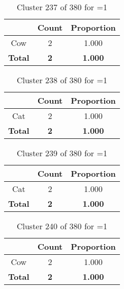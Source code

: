 \begin{table}[ht!]
\centering
\begin{tabular}{|c|c|c|}
\hline
\bf \Spec{} &\bf Count &\bf Proportion\\ \hline \hline
Cow & 2 & 1.000\\ \hline
\hline
\bf Total & \bf 2 & \bf 1.000\\ \hline
\end{tabular}
\label{tab:cluster:237:1}
\caption{Cluster 237 of 380 for \minneigh{}=1}
\end{table}

\begin{table}[ht!]
\centering
\begin{tabular}{|c|c|c|}
\hline
\bf \Spec{} &\bf Count &\bf Proportion\\ \hline \hline
Cat & 2 & 1.000\\ \hline
\hline
\bf Total & \bf 2 & \bf 1.000\\ \hline
\end{tabular}
\label{tab:cluster:238:1}
\caption{Cluster 238 of 380 for \minneigh{}=1}
\end{table}

\begin{table}[ht!]
\centering
\begin{tabular}{|c|c|c|}
\hline
\bf \Spec{} &\bf Count &\bf Proportion\\ \hline \hline
Cat & 2 & 1.000\\ \hline
\hline
\bf Total & \bf 2 & \bf 1.000\\ \hline
\end{tabular}
\label{tab:cluster:239:1}
\caption{Cluster 239 of 380 for \minneigh{}=1}
\end{table}

\clearpage
\begin{table}[ht!]
\centering
\begin{tabular}{|c|c|c|}
\hline
\bf \Spec{} &\bf Count &\bf Proportion\\ \hline \hline
Cow & 2 & 1.000\\ \hline
\hline
\bf Total & \bf 2 & \bf 1.000\\ \hline
\end{tabular}
\label{tab:cluster:240:1}
\caption{Cluster 240 of 380 for \minneigh{}=1}
\end{table}


